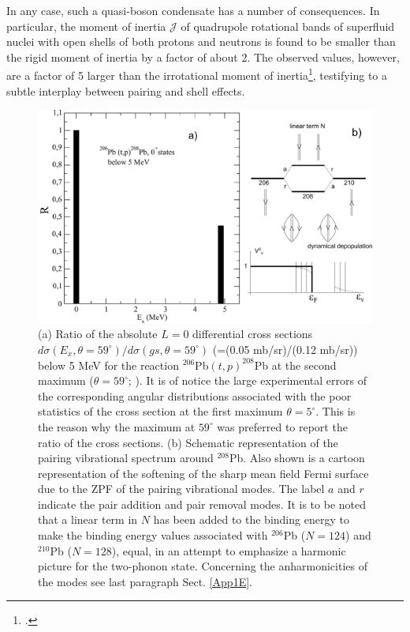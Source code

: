 In any case, such a  quasi-boson condensate has a number of consequences. In particular, the moment of inertia $\mathcal J$ of quadrupole rotational bands of superfluid nuclei with open shells of both protons and neutrons is found to be smaller than the rigid moment of inertia by a factor of about 2. The observed values, however, are a factor of 5 larger than the irrotational moment of inertia\footnote{\cite{Bohr:75,Belyaev:59,Belyaev:13}.}, testifying to a subtle interplay between pairing and shell effects.
\begin{figure}
\centerline{\includegraphics*[width=\textwidth,angle=0]{nutshell/figs/Excited0Pb206tp.pdf}}
\caption{(a) Ratio of the absolute $L=0$ differential cross sections $d\sigma(E_x,\theta=59^{\circ})/d\sigma(gs,\theta=59^{\circ})$ (=(0.05 mb/sr)/(0.12 mb/sr)) below 5 MeV  for the reaction $^{206}$Pb$(t,p)^{208}$Pb at the second maximum ($\theta=59^{\circ}$; \cite{Bjerregaard:66b}). It is of notice the large experimental errors of the corresponding angular distributions associated with the poor statistics of the cross section at the first maximum $\theta=5^{\circ}$. This is the reason why the maximum at $59^\circ$ was preferred to report the ratio of the cross sections. (b) Schematic representation of the pairing vibrational spectrum around $^{208}$Pb. Also shown is a cartoon representation of the softening of the sharp mean field Fermi surface due to the ZPF of the pairing vibrational modes. The label $a$ and $r$ indicate the pair addition and pair removal modes. It is to be noted that a linear term in $N$ has been added to the binding energy to make the binding energy values associated with $^{206}$Pb ($N=124$) and $^{210}$Pb ($N=128$), equal, in an attempt to emphasize a harmonic picture for the two-phonon state. Concerning the anharmonicities of the modes see last paragraph Sect. \ref{App1E}.}\label{fig1.1}
\end{figure}



